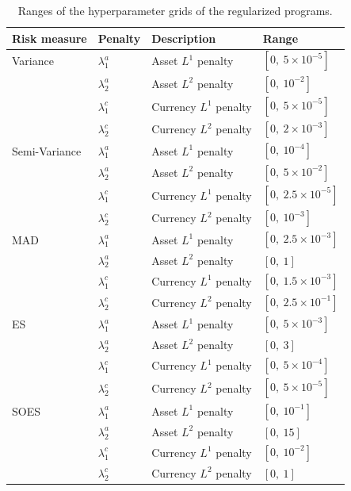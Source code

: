 \begin{table}[!t]
\centering
\small
\begin{tabular}{llll}
\toprule
Risk measure & Penalty & Description & Range \\
\midrule
Variance      & $\lambda_1^a$ & Asset $L^1$ penalty    & $[0,\ 5\times10^{-5}]$ \\
              & $\lambda_2^a$ & Asset $L^2$ penalty    & $[0,\ 10^{-2}]$ \\
              & $\lambda_1^c$ & Currency $L^1$ penalty & $[0,\ 5\times10^{-5}]$ \\
              & $\lambda_2^c$ & Currency $L^2$ penalty & $[0,\ 2\times10^{-3}]$ \\
\midrule
Semi-Variance & $\lambda_1^a$ & Asset $L^1$ penalty    & $[0,\ 10^{-4}]$ \\
              & $\lambda_2^a$ & Asset $L^2$ penalty    & $[0,\ 5\times10^{-2}]$ \\
              & $\lambda_1^c$ & Currency $L^1$ penalty & $[0,\ 2.5\times10^{-5}]$ \\
              & $\lambda_2^c$ & Currency $L^2$ penalty & $[0,\ 10^{-3}]$ \\
\midrule
MAD           & $\lambda_1^a$ & Asset $L^1$ penalty    & $[0,\ 2.5\times10^{-3}]$ \\
              & $\lambda_2^a$ & Asset $L^2$ penalty    & $[0,\ 1]$ \\
              & $\lambda_1^c$ & Currency $L^1$ penalty & $[0,\ 1.5\times10^{-3}]$ \\
              & $\lambda_2^c$ & Currency $L^2$ penalty & $[0,\ 2.5\times10^{-1}]$ \\
\midrule
ES            & $\lambda_1^a$ & Asset $L^1$ penalty    & $[0,\ 5\times10^{-3}]$ \\
              & $\lambda_2^a$ & Asset $L^2$ penalty    & $[0,\ 3]$ \\
              & $\lambda_1^c$ & Currency $L^1$ penalty & $[0,\ 5\times10^{-4}]$ \\
              & $\lambda_2^c$ & Currency $L^2$ penalty & $[0,\ 5\times10^{-5}]$ \\
\midrule
SOES          & $\lambda_1^a$ & Asset $L^1$ penalty    & $[0,\ 10^{-1}]$ \\
              & $\lambda_2^a$ & Asset $L^2$ penalty    & $[0,\ 15]$ \\
              & $\lambda_1^c$ & Currency $L^1$ penalty & $[0,\ 10^{-2}]$ \\
              & $\lambda_2^c$ & Currency $L^2$ penalty & $[0,\ 1]$ \\
\bottomrule
\end{tabular}
\caption{Ranges of the hyperparameter grids of the regularized programs.}
\label{tab:hypergrid}
\end{table}

